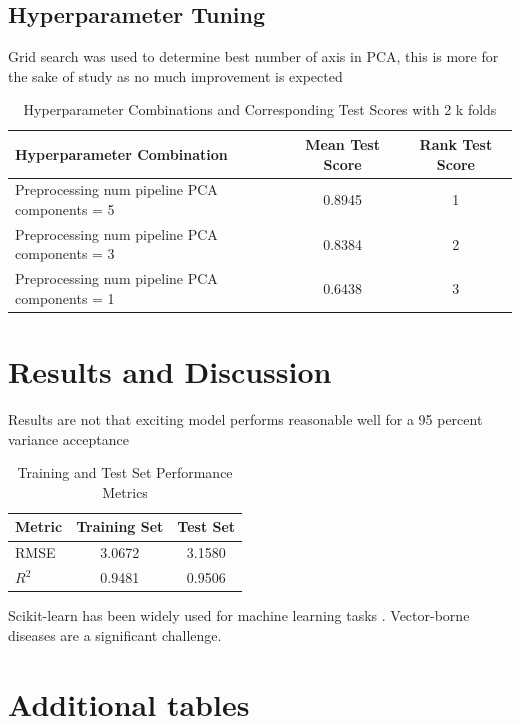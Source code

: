 \documentclass{article}
\begin{document}
\subsection{Hyperparameter Tuning}
Grid search was used to determine best number of axis 
in PCA, this is more for the sake of study as no much improvement is expected
\begin{table}[h!]
    \centering
    \caption{Hyperparameter Combinations and Corresponding Test Scores with 2 k folds}
    \label{tab:hyperparam_scores}
    \begin{tabular}{lcc}
    \toprule
    \textbf{Hyperparameter Combination} & \textbf{Mean Test Score} & \textbf{Rank Test Score} \\
    \midrule
    Preprocessing num pipeline PCA components = 5 & 0.8945 & 1 \\
    Preprocessing num pipeline PCA components = 3 & 0.8384 & 2 \\
    Preprocessing num pipeline PCA components = 1 & 0.6438 & 3 \\
    \bottomrule
    \end{tabular}
    \end{table}


\section{Results and Discussion}

Results are not that exciting model performs reasonable well for a 95 percent variance
acceptance

\begin{table}[h!]
    \centering
    \caption{Training and Test Set Performance Metrics}
    \label{tab:performance_metrics}
    \renewcommand{\arraystretch}{1.2} %
    \begin{tabular}{lcc}
        \toprule
        \textbf{Metric} & \textbf{Training Set} & \textbf{Test Set} \\
        \midrule
        RMSE            & 3.0672               & 3.1580           \\
        \( R^2 \)       & 0.9481               & 0.9506           \\
        \bottomrule
    \end{tabular}
\end{table}

Scikit-learn has been widely used for machine learning tasks \cite{disease_dataset2023}. Vector-borne diseases are a significant challenge\cite{disease_dataset2023}.

\appendix
\section{Additional tables}


\label{sec:appendix}


\end{document}
